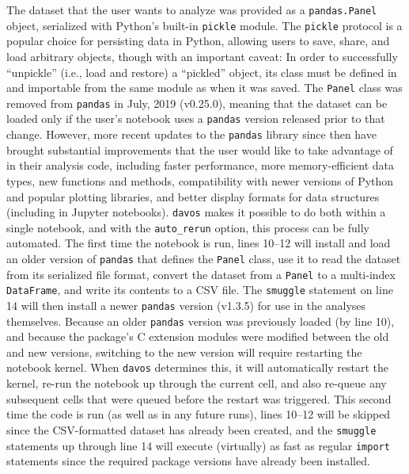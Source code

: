 \documentclass[preprint,12pt,a4paper]{elsarticle}
\begin{document}
The dataset that the user wants to analyze was provided as a \texttt{pandas.Panel} object, serialized with Python's built-in \texttt{pickle} module. The \texttt{pickle} protocol is a popular choice for persisting data in Python, allowing users to save, share, and load arbitrary objects, though with an important caveat:
In order to successfully ``unpickle'' (i.e., load and restore) a ``pickled'' object, its class must be defined in and importable from the same module as when it was saved.
The \texttt{Panel} class was removed from \texttt{pandas} in July, 2019 (v0.25.0), meaning that the dataset can be loaded only if the user's notebook uses a \texttt{pandas} version released prior to that change. However, more recent updates to the \texttt{pandas} library since then have brought substantial improvements that the user would like to take advantage of in their analysis code, including faster performance, more memory-efficient data types, new functions and methods, compatibility with newer versions of Python and popular plotting libraries, and better display formats for data structures (including in Jupyter notebooks).
\texttt{davos} makes it possible to do both within a single notebook, and with the \texttt{auto\_rerun} option, this process can be fully automated. The first time the notebook is run, lines 10--12 will install and load an older version of \texttt{pandas} that defines the \texttt{Panel} class, use it to read the dataset from its serialized file format, convert the dataset from a \texttt{Panel} to a multi-index \texttt{DataFrame}, and write its contents to a CSV file. The \texttt{smuggle} statement on line 14 will then install a newer \texttt{pandas} version (v1.3.5) for use in the analyses themselves. Because an older \texttt{pandas} version was previously loaded (by line 10), and because the package's C extension modules were modified between the old and new versions, switching to the new version will require restarting the notebook kernel. When \texttt{davos} determines this, it will automatically restart the kernel, re-run the notebook up through the current cell, and also re-queue any subsequent cells that were queued before the restart was triggered. This second time the code is run (as well as in any future runs), lines 10--12 will be skipped since the CSV-formatted dataset has already been created, and the \texttt{smuggle} statements up through line 14 will execute (virtually) as fast as regular \texttt{import} statements since the required package versions have already been installed.
\end{document}
